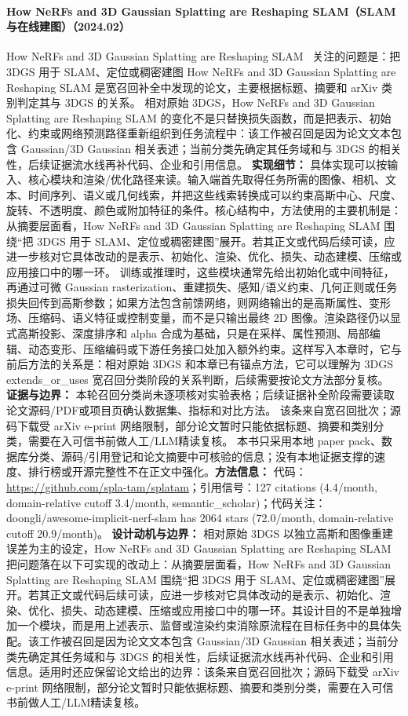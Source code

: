 \paragraph{How NeRFs and 3D Gaussian Splatting are Reshaping SLAM（SLAM 与在线建图）（2024.02）}
How NeRFs and 3D Gaussian Splatting are Reshaping SLAM~\cite{2402_13255} 关注的问题是：把 3DGS 用于 SLAM、定位或稠密建图 How NeRFs and 3D Gaussian Splatting are Reshaping SLAM 是宽召回补全中发现的论文，主要根据标题、摘要和 arXiv 类别判定其与 3DGS 的关系。
相对原始 3DGS，How NeRFs and 3D Gaussian Splatting are Reshaping SLAM 的变化不是只替换损失函数，而是把表示、初始化、约束或网络预测路径重新组织到任务流程中：该工作被召回是因为论文文本包含 Gaussian/3D Gaussian 相关表述；当前分类先确定其任务域和与 3DGS 的相关性，后续证据流水线再补代码、企业和引用信息。
\textbf{实现细节：} 具体实现可以按输入、核心模块和渲染/优化路径来读。输入端首先取得任务所需的图像、相机、文本、时间序列、语义或几何线索，并把这些线索转换成可以约束高斯中心、尺度、旋转、不透明度、颜色或附加特征的条件。核心结构中，方法使用的主要机制是：从摘要层面看，How NeRFs and 3D Gaussian Splatting are Reshaping SLAM 围绕“把 3DGS 用于 SLAM、定位或稠密建图”展开。若其正文或代码后续可读，应进一步核对它具体改动的是表示、初始化、渲染、优化、损失、动态建模、压缩或应用接口中的哪一环。 训练或推理时，这些模块通常先给出初始化或中间特征，再通过可微 Gaussian rasterization、重建损失、感知/语义约束、几何正则或任务损失回传到高斯参数；如果方法包含前馈网络，则网络输出的是高斯属性、变形场、压缩码、语义特征或控制变量，而不是只输出最终 2D 图像。渲染路径仍以显式高斯投影、深度排序和 alpha 合成为基础，只是在采样、属性预测、局部编辑、动态变形、压缩编码或下游任务接口处加入额外约束。这样写入本章时，它与前后方法的关系是：相对原始 3DGS 和本章已有锚点方法，它可以理解为 3DGS extends\_or\_uses 宽召回分类阶段的关系判断，后续需要按论文方法部分复核。
\textbf{证据与边界：} 本轮召回分类尚未逐项核对实验表格；后续证据补全阶段需要读取论文源码/PDF或项目页确认数据集、指标和对比方法。 该条来自宽召回批次；源码下载受 arXiv e-print 网络限制，部分论文暂时只能依据标题、摘要和类别分类，需要在入可信书前做人工/LLM精读复核。 本书只采用本地 paper pack、数据库分类、源码/引用登记和论文摘要中可核验的信息；没有本地证据支撑的速度、排行榜或开源完整性不在正文中强化。\textbf{方法信息：} 代码：\url{https://github.com/spla-tam/splatam}；引用信号：127 citations (4.4/month, domain-relative cutoff 3.4/month, semantic\_scholar)；代码关注：doongli/awesome-implicit-nerf-slam has 2064 stars (72.0/month, domain-relative cutoff 20.9/month)。
\textbf{设计动机与边界：} 相对原始 3DGS 以独立高斯和图像重建误差为主的设定，How NeRFs and 3D Gaussian Splatting are Reshaping SLAM 把问题落在以下可实现的改动上：从摘要层面看，How NeRFs and 3D Gaussian Splatting are Reshaping SLAM 围绕“把 3DGS 用于 SLAM、定位或稠密建图”展开。若其正文或代码后续可读，应进一步核对它具体改动的是表示、初始化、渲染、优化、损失、动态建模、压缩或应用接口中的哪一环。其设计目的不是单独增加一个模块，而是用上述表示、监督或渲染约束消除原流程在目标任务中的具体失配。该工作被召回是因为论文文本包含 Gaussian/3D Gaussian 相关表述；当前分类先确定其任务域和与 3DGS 的相关性，后续证据流水线再补代码、企业和引用信息。适用时还应保留论文给出的边界：该条来自宽召回批次；源码下载受 arXiv e-print 网络限制，部分论文暂时只能依据标题、摘要和类别分类，需要在入可信书前做人工/LLM精读复核。
